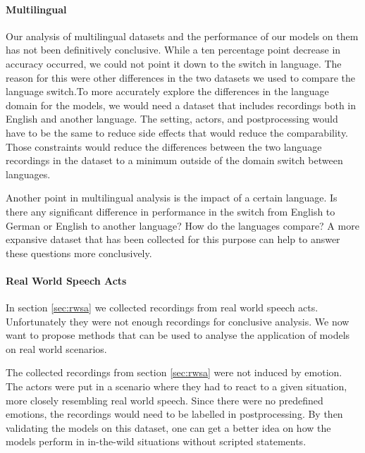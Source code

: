 \paragraph{Multilingual}
Our analysis of multilingual datasets and the performance of our models on them has not been definitively conclusive. While a ten percentage point decrease in accuracy occurred, we could not point it down to the switch in language. The reason for this were other differences in the two datasets we used to compare the language switch.To more accurately explore the differences in the language domain for the models, we would need a dataset that includes recordings both in English and another language. The setting, actors, and postprocessing would have to be the same to reduce side effects that would reduce the comparability. Those constraints would reduce the differences between the two language recordings in the dataset to a minimum outside of the domain switch between languages. 

Another point in multilingual analysis is the impact of a certain language. Is there any significant difference in performance in the switch from English to German or English to another language? How do the languages compare? A more expansive dataset that has been collected for this purpose can help to answer these questions more conclusively.

\paragraph{Real World Speech Acts}
In section \ref{sec:rwsa} we collected recordings from real world speech acts. Unfortunately they were not enough recordings for conclusive analysis. We now want to propose methods that can be used to analyse the application of models on real world scenarios.

The collected recordings from section \ref{sec:rwsa} were not induced by emotion. The actors were put in a scenario where they had to react to a given situation, more closely resembling real world speech. Since there were no predefined emotions, the recordings would need to be labelled in postprocessing. By then validating the models on this dataset, one can get a better idea on how the models perform in in-the-wild situations without scripted statements.

